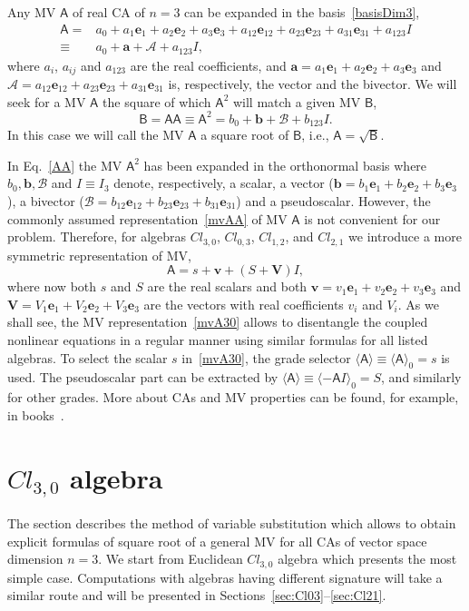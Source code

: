 \documentclass{birkjour}
\newcommand{\e}[1]{\mathbf{e}_{#1}} %
\def\m#1{\mathsf{#1}} %
\newcommand{\cl}[2]{\ensuremath{\mathit{Cl}_{#1,#2}}}
\def\A{\mathsf{A}}
\def\B{\mathsf{B}}
\def\m#1{\mathsf{#1}}%
\def\e#1{\mathbf{e}_{#1}} %
\newcommand{\ba}{\ensuremath{\mathbf{a}}}
\newcommand{\bb}{\ensuremath{\mathbf{b}}}
\newcommand{\bv}{\ensuremath{\mathbf{v}}}
\newcommand{\bV}{\ensuremath{\mathbf{V}}}
\newcommand{\cA}{\ensuremath{\mathcal{A}}}
\newcommand{\cB}{\ensuremath{\mathcal{B}}}
\begin{document}
Any MV $\A$ of real CA of $n=3$ can be expanded in the
basis~\eqref{basisDim3},
\begin{equation}\begin{split}\label{mvAA}
\A=&a_0+a_1\e{1}+a_2\e{2}+a_3\e{3}+a_{12}\e{12}+a_{23}\e{23}+a_{31}\e{31}+a_{123}I\\
\equiv&a_0+\ba+\cA+a_{123}I,
\end{split}\end{equation} where $a_i$, $a_{ij}$ and $a_{123}$ are the real
coefficients, and $\ba=a_1\e{1}+a_2\e{2}+a_3\e{3}$ and
$\cA=a_{12}\e{12}+a_{23}\e{23}+a_{31}\e{31}$ is, respectively, the
vector and the bivector. We will seek for a MV $\A$ the square of
which $\A^2$ will match a given MV $\B$,
\begin{equation}\label{AA}
  \B=\A\A\equiv\A^2=b_0+\mathbf{b}+\cB+b_{123}I.
\end{equation}
In this case we will call the MV $\A$ a square root of $\B$, i.e.,
$\A=\sqrt{\B}$.

In Eq.~\eqref{AA} the MV $\A^2$ has been expanded in the
orthonormal basis where $b_0,\mathbf{b},\cB$ and $I\equiv I_3 $
denote, respectively, a scalar, a vector
($\bb=b_1\e{1}+b_2\e{2}+b_3\e{3}$), a bivector
($\cB=b_{12}\e{12}+b_{23}\e{23}+b_{31}\e{31}$) and a pseudoscalar.
However, the commonly assumed representation~\eqref{mvAA}
of MV $\A$ is not convenient for our problem. Therefore, for
algebras \cl{3}{0}, \cl{0}{3}, \cl{1}{2}, and \cl{2}{1} we
introduce a more symmetric representation of MV,
\begin{equation}
\A=s+\bv+(S+\bV)I,\label{mvA30}
\end{equation}
where now both $s$ and $S$ are the real scalars and both
$\bv=v_1\e{1}+v_2\e{2}+v_3\e{3}$ and
$\bV=V_1\e{1}+V_2\e{2}+V_3\e{3}$ are the vectors with real
coefficients $v_i$ and $V_i$. As we shall see, the MV
representation~\eqref{mvA30} allows to disentangle the coupled
nonlinear equations in a regular manner using similar formulas for
all listed algebras. To select the scalar $s$ in~\eqref{mvA30},
the grade selector
$\langle\m{A}\rangle\equiv\langle\m{A}\rangle_0=s$ is used. The
pseudoscalar part  can be extracted by
$\langle\m{A}\rangle\equiv\langle-\m{A}I\rangle_0=S$, and
similarly for other grades. More about CAs and MV properties can
be found, for example, in books~\cite{Doran03,Lounesto97}.



\section{\cl{3}{0} algebra\label{sec:Cl30}}
The section describes the method of
variable substitution which allows to obtain explicit formulas of
square root of a general MV for all CAs of vector space dimension $n=3$. We
start from Euclidean \cl{3}{0} algebra which presents the most
simple case. Computations with algebras having different signature
will take a similar route and will be presented in
Sections~\ref{sec:Cl03}--\ref{sec:Cl21}.
\end{document}

